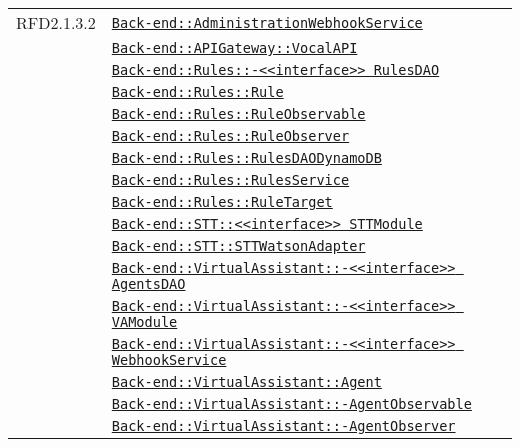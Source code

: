 \begin{longtable}{|>{\centering}m{3cm}|m{10cm}<{\centering}|}
RFD2.1.3.2 & \hyperref[Back-end::AdministrationWebhookService]{\texttt{Back-end::AdministrationWebhookService}}\\
& \hyperref[Back-end::APIGateway::VocalAPI]{\texttt{Back-end::APIGateway::VocalAPI}}\\
& \hyperref[Back-end::Rules::<<interface>> RulesDAO]{\texttt{Back-end::Rules::-\linebreak <<interface>> RulesDAO}}\\
& \hyperref[Back-end::Rules::Rule]{\texttt{Back-end::Rules::Rule}}\\
& \hyperref[Back-end::Rules::RuleObservable]{\texttt{Back-end::Rules::RuleObservable}}\\
& \hyperref[Back-end::Rules::RuleObserver]{\texttt{Back-end::Rules::RuleObserver}}\\
& \hyperref[Back-end::Rules::RulesDAODynamoDB]{\texttt{Back-end::Rules::RulesDAODynamoDB}}\\
& \hyperref[Back-end::Rules::RulesService]{\texttt{Back-end::Rules::RulesService}}\\
& \hyperref[Back-end::Rules::RuleTarget]{\texttt{Back-end::Rules::RuleTarget}}\\
& \hyperref[Back-end::STT::<<interface>> STTModule]{\texttt{Back-end::STT::<<interface>> STTModule}}\\
& \hyperref[Back-end::STT::STTWatsonAdapter]{\texttt{Back-end::STT::STTWatsonAdapter}}\\
& \hyperref[Back-end::VirtualAssistant::<<interface>> AgentsDAO]{\texttt{Back-end::VirtualAssistant::-\linebreak <<interface>> AgentsDAO}}\\
& \hyperref[Back-end::VirtualAssistant::<<interface>> VAModule]{\texttt{Back-end::VirtualAssistant::-\linebreak <<interface>> VAModule}}\\
& \hyperref[Back-end::VirtualAssistant::<<interface>> WebhookService]{\texttt{Back-end::VirtualAssistant::-\linebreak <<interface>> WebhookService}}\\
& \hyperref[Back-end::VirtualAssistant::Agent]{\texttt{Back-end::VirtualAssistant::Agent}}\\
& \hyperref[Back-end::VirtualAssistant::AgentObservable]{\texttt{Back-end::VirtualAssistant::-\linebreak AgentObservable}}\\
& \hyperref[Back-end::VirtualAssistant::AgentObserver]{\texttt{Back-end::VirtualAssistant::-\linebreak AgentObserver}}\\

\end{longtable}
